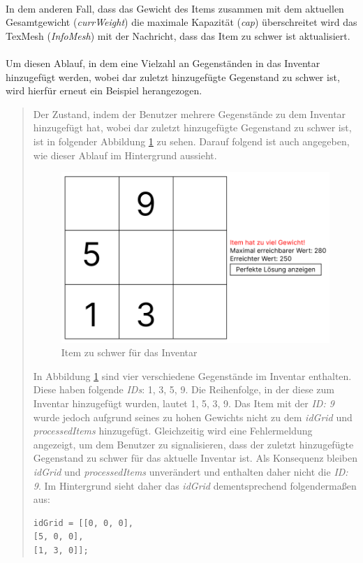 \\
In dem anderen Fall, dass das Gewicht des Items zusammen mit dem aktuellen Gesamtgewicht (\textit{currWeight}) die maximale
Kapazität (\textit{cap}) überschreitet wird das TexMesh (\textit{InfoMesh}) mit der Nachricht, dass das Item zu schwer ist
aktualisiert.\\
\\
Um diesen Ablauf, in dem eine Vielzahl an Gegenständen in das Inventar hinzugefügt werden, wobei dar zuletzt hinzugefügte
Gegenstand zu schwer ist, wird hierfür erneut ein Beispiel herangezogen.

\begin{quote}
Der Zustand, indem der Benutzer mehrere Gegenstände zu dem Inventar hinzugefügt hat, wobei dar zuletzt hinzugefügte
Gegenstand zu schwer ist, ist in folgender Abbildung \ref{fig:controller_itemToHeavy} zu sehen. Darauf folgend ist auch
angegeben, wie dieser Ablauf im Hintergrund aussieht.

\begin{figure}[H]
    \centering
    \includegraphics[scale=0.6]{images/itemToHeavy}
    \caption{Item zu schwer für das Inventar}
    \label{fig:controller_itemToHeavy}
\end{figure}

In Abbildung \ref{fig:controller_itemToHeavy} sind vier verschiedene Gegenstände im Inventar enthalten. Diese haben folgende
\textit{IDs}: 1, 3, 5, 9. Die Reihenfolge, in der diese zum Inventar hinzugefügt wurden, lautet 1, 5, 3, 9. Das Item mit der
\textit{ID: 9} wurde jedoch aufgrund seines zu hohen Gewichts nicht zu dem \textit{idGrid} und \textit{processedItems}
hinzugefügt. Gleichzeitig wird eine Fehlermeldung angezeigt, um dem Benutzer zu signalisieren, dass der zuletzt hinzugefügte
Gegenstand zu schwer für das aktuelle Inventar ist. Als Konsequenz bleiben \textit{idGrid} und \textit{processedItems}
unverändert und enthalten daher nicht die \textit{ID: 9}. Im Hintergrund sieht daher das \textit{idGrid} dementsprechend folgendermaßen aus:
\begin{lstlisting}[style=csharp label=code:controller_savedIDs]
idGrid = [[0, 0, 0],
[5, 0, 0],
[1, 3, 0]];
\end{lstlisting}


\end{quote}
